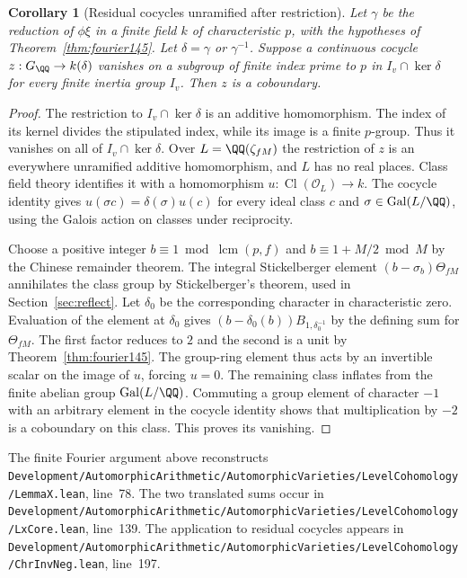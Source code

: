 \documentclass[a4paper,11pt]{article}
\newtheorem{corollary}[proposition]{Corollary}
\theoremstyle{definition}
\theoremstyle{remark}
\newcommand{\srcloc}[2]{{\small\nolinkurl{#1.lean}}, line~#2}
\numberwithin{equation}{section}
\newcommand{\Cl}{\operatorname{Cl}}
\newcommand{\OO}{\mathcal O}
\begin{document}
\begin{corollary}[Residual cocycles unramified after restriction]
\label{cor:coc145}
Let \(\gamma\) be the reduction of \(\phi\xi\) in a finite
field \(k\) of characteristic \(p\), with the hypotheses of
Theorem~\ref{thm:fourier145}. Let \(\delta=\gamma\) or
\(\gamma^{-1}\). Suppose a continuous cocycle
\(z:G_\QQ\to k(\delta)\) vanishes on a subgroup of finite
index prime to \(p\) in \(I_v\cap\ker\delta\) for every finite
inertia group \(I_v\). Then \(z\) is a coboundary.
\end{corollary}
\begin{proof}
The restriction to \(I_v\cap\ker\delta\) is an additive
homomorphism. The index of its kernel divides the stipulated
index, while its image is a finite \(p\)-group. Thus it vanishes
on all of \(I_v\cap\ker\delta\). Over \(L=\QQ(\zeta_{fM})\)
the restriction of \(z\) is an everywhere unramified additive
homomorphism, and \(L\) has no real places. Class field theory
identifies it with a homomorphism \(u:\Cl(\OO_L)\to k\).
The cocycle identity gives
\(u(\sigma c)=\delta(\sigma)u(c)\) for every ideal class \(c\)
and \(\sigma\in\operatorname{Gal}(L/\QQ)\), using the Galois
action on classes under reciprocity.

Choose a positive integer \(b\equiv1\bmod \operatorname{lcm}(p,f)\)
and \(b\equiv1+M/2\bmod M\) by the Chinese remainder theorem.
The integral Stickelberger element \((b-\sigma_b)\Theta_{fM}\)
annihilates the class group by Stickelberger's theorem, used
in Section~\ref{sec:reflect}. Let \(\delta_0\) be the corresponding
character in characteristic zero. Evaluation of the element
at \(\delta_0\) gives
\((b-\delta_0(b))B_{1,\delta_0^{-1}}\) by the defining
sum for \(\Theta_{fM}\). The first factor reduces to \(2\)
and the second is a unit by
Theorem~\ref{thm:fourier145}. The group-ring element thus acts
by an invertible scalar on the image of \(u\), forcing \(u=0\).
The remaining class inflates from the finite abelian group
\(\operatorname{Gal}(L/\QQ)\). Commuting a group element of
character \(-1\) with an arbitrary element in the cocycle
identity shows that multiplication by \(-2\) is a coboundary
on this class. This proves its vanishing.
\end{proof}

The finite Fourier argument above reconstructs
\srcloc{Development/AutomorphicArithmetic/AutomorphicVarieties/LevelCohomology/LemmaX}{78}.
The two translated sums occur in
\srcloc{Development/AutomorphicArithmetic/AutomorphicVarieties/LevelCohomology/LxCore}{139}.
The application to residual cocycles appears in
\srcloc{Development/AutomorphicArithmetic/AutomorphicVarieties/LevelCohomology/ChrInvNeg}{197}.
\end{document}
